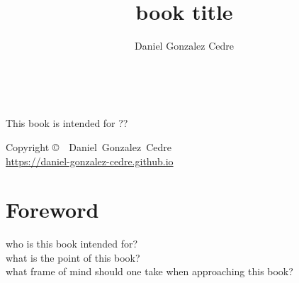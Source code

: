 





\title{book title}
\author[Daniel Gonzalez Cedre]{Daniel Gonzalez Cedre}

\makeindex[intoc]



\frontmatter

\maketitle

\newpage  %
\begin{fullwidth}
    ~\vfill
    \thispagestyle{empty}
    \setlength{\parindent}{0pt}
    \setlength{\parskip}{\baselineskip}


    \par This book is intended for ??

    \par Copyright \copyright\ \the\year\ Daniel~Gonzalez~Cedre\\
    \url{https://daniel-gonzalez-cedre.github.io}
\end{fullwidth}

{\hypersetup{hidelinks}\tableofcontents}

\mainmatter

\chapter*{Foreword}
who is this book intended for?\\
what is the point of this book?\\
what frame of mind should one take when approaching this book?



\appendix


\blankpage
\printindex


